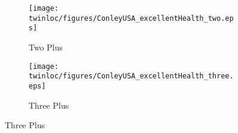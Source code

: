 \begin{figure}[htpb!]
\begin{center}
\caption{Plausibly Exogenous Bounds: Excellent Health (USA)}
\label{TWINfig:HPEx-USA}
\begin{subfigure}{.5\textwidth}
  \centering
  \texttt{[image: \\twinloc/figures/ConleyUSA\_excellentHealth\_two.eps]}
  \caption{Two Plus}
  \label{TWINfig:HPEx-USA2}
\end{subfigure}%
\begin{subfigure}{.5\textwidth}
  \centering
  \texttt{[image: \\twinloc/figures/ConleyUSA\_excellentHealth\_three.eps]}
  \caption{Three Plus}
  \label{TWINfig:HPEx-USA2}
\end{subfigure}
\end{center}
\end{figure}

